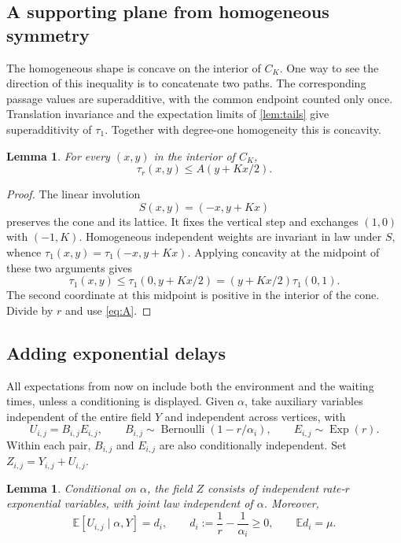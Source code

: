 \documentclass[11pt]{amsart}
\newtheorem{lemma}[theorem]{Lemma}
\theoremstyle{remark}
\newcommand{\EE}{\mathbb E}
\DeclareMathOperator{\Exp}{Exp}
\DeclareMathOperator{\Ber}{Bernoulli}
\numberwithin{equation}{section}
\begin{document}
\subsection{A supporting plane from homogeneous symmetry}
The homogeneous shape is concave on the interior of $C_K$.
One way to see the direction of this inequality is to concatenate two
paths. The corresponding passage values are superadditive, with the
common endpoint counted only once. Translation invariance and the
expectation limits of \cref{lem:tails} give superadditivity of
$\tau_1$. Together with degree-one homogeneity this is concavity.

\begin{lemma}\label{lem:plane}
For every $(x,y)$ in the interior of $C_K$,
\begin{equation}\label{eq:plane}
 \tau_r(x,y)\leq A(y+Kx/2).
\end{equation}
\end{lemma}

\begin{proof}
The linear involution
\[
 S(x,y)=(-x,y+Kx)
\]
preserves the cone and its lattice. It fixes the vertical step and
exchanges $(1,0)$ with $(-1,K)$. Homogeneous independent weights are
invariant in law under $S$, whence
$\tau_1(x,y)=\tau_1(-x,y+Kx)$. Applying concavity at the midpoint of
these two arguments gives
\[
 \tau_1(x,y)\leq\tau_1(0,y+Kx/2)
                 =(y+Kx/2)\tau_1(0,1).
\]
The second coordinate at this midpoint is positive in the interior of
the cone. Divide by $r$ and use \eqref{eq:A}.
\end{proof}

\subsection{Adding exponential delays}
All expectations from now on include both the environment and the
waiting times, unless a conditioning is displayed. Given $\alpha$,
take auxiliary variables independent of the entire field $Y$ and
independent across vertices, with
\begin{equation}\label{eq:auxiliary}
 U_{i,j}=B_{i,j}E_{i,j},\qquad
 B_{i,j}\sim\Ber(1-r/\alpha_i),\qquad
 E_{i,j}\sim\Exp(r).
\end{equation}
Within each pair, $B_{i,j}$ and $E_{i,j}$ are also conditionally
independent. Set $Z_{i,j}=Y_{i,j}+U_{i,j}$.

\begin{lemma}\label{lem:addition}
Conditional on $\alpha$, the field $Z$ consists of independent
rate-$r$ exponential variables, with joint law independent of
$\alpha$. Moreover,
\begin{equation}\label{eq:delay-mean}
 \EE[U_{i,j}\mid\alpha,Y]=d_i,
 \qquad d_i:=\frac1r-\frac1{\alpha_i}\geq0,
 \qquad \EE d_i=\mu.
\end{equation}
\end{lemma}
\end{document}
